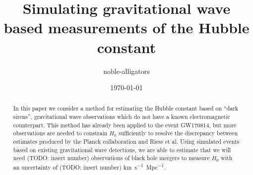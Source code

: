 \documentclass[a4paper, amsfonts, amssymb, amsmath, reprint, showkeys, nofootinbib, twoside]{revtex4-1}
\begin{document}
\title{Simulating gravitational wave based measurements of the Hubble constant}

\author{noble-alligators}

\date{\today} %

\begin{abstract}
  In this paper we consider a method for estimating the Hubble constant based on ``dark sirens'', gravitational wave observations which do not have a known electromagnetic counterpart. This method has already been applied to the event GW170814, but more observations are needed to constrain $H_0$ sufficiently to resolve the discrepancy between estimates produced by the Planck collaboration and Riess et al. Using simulated events based on existing gravitational wave detections, we are able to estimate that we will need (TODO: insert number) observations of black hole mergers  to measure $H_0$ with an uncertainty of (TODO: insert number) \si{km.s^{-1}.Mpc^{-1}}.
\end{abstract}



\maketitle




%


%

%
%



\end{document}
